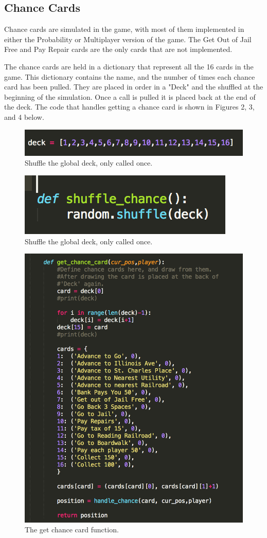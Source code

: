 \documentclass[12pt, letter]{article}
\begin{document}
\subsection{Chance Cards}

Chance cards are simulated in the game, with most of them implemented in either the Probability or Multiplayer version of the game. The Get Out of Jail Free and Pay Repair cards are the only cards that are not implemented.

The chance cards are held in a dictionary that represent all the 16 cards in the game. This dictionary contains the name, and the number of times each chance card has been pulled. They are placed in order in a "Deck" and the shuffled at the beginning of the simulation. Once a call is pulled it is placed back at the end of the deck. The code that handles getting a chance card is shown in Figures 2, 3, and 4 below. 

 \begin{figure}[htb]
  \centering
  \includegraphics[width=0.50 \textwidth]{./figures/deck.png}
  \caption{Shuffle the global deck, only called once.}
\end{figure}

 \begin{figure}[htb]
  \centering
  \includegraphics[width=0.40 \textwidth]{./figures/shuffler.png}
  \caption{Shuffle the global deck, only called once.}
\end{figure}

 \begin{figure}[htb]
  \centering
  \includegraphics[width=0.75 \textwidth]{./figures/get_chance.png}
  \caption{The get chance card function.}
\end{figure}
\end{document}
